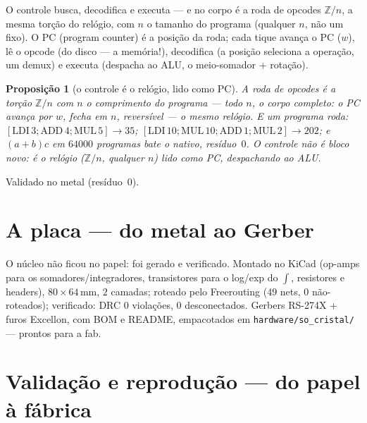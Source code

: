 \documentclass[11pt,a4paper]{article}
\newtheorem{proposicao}{Proposição}
\begin{document}
O controle busca, decodifica e executa --- e no corpo é a roda de opcodes $\mathbb{Z}/n$, a mesma torção
do relógio, com $n$ o tamanho do programa (qualquer $n$, não um fixo). O PC (program counter)
é a posição da roda; cada tique avança o PC ($w$), lê o opcode (do disco --- a memória!), decodifica
(a posição seleciona a operação, um demux) e executa (despacha ao ALU, o meio-somador + rotação).

\begin{proposicao}[o controle é o relógio, lido como PC]
A roda de opcodes é a torção $\mathbb{Z}/n$ com $n$ o comprimento do programa --- todo $n$, o corpo completo:
o PC avança por $w$, fecha em $n$, reversível --- o mesmo relógio. E um programa roda:
$[\mathrm{LDI}\,3;\mathrm{ADD}\,4;\mathrm{MUL}\,5]\to 35$;
$[\mathrm{LDI}\,10;\mathrm{MUL}\,10;\mathrm{ADD}\,1;\mathrm{MUL}\,2]\to 202$;
e $(a+b)c$ em $64000$ programas bate o nativo, resíduo~$0$.
O controle não é bloco novo: é o relógio ($\mathbb{Z}/n$, qualquer $n$) lido como PC, despachando ao ALU.
\end{proposicao}

Validado no metal (resíduo~$0$).

\section{A placa --- do metal ao Gerber}

O núcleo não ficou no papel: foi gerado e verificado. Montado no KiCad (op-amps para os
somadores/integradores, transistores para o log/exp do $\displaystyle\int$, resistores e headers),
$80\times 64\,\mathrm{mm}$, $2$ camadas; roteado pelo Freerouting ($49$ nets, $0$ não-roteados);
verificado: DRC $0$ violações, $0$ desconectados. Gerbers RS-274X + furos Excellon, com BOM e README,
empacotados em \texttt{hardware/so\_cristal/} --- prontos para a fab.

\begin{center}
\end{center}

\section{Validação e reprodução --- do papel à fábrica}
\end{document}
